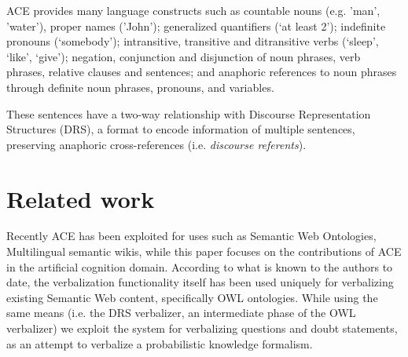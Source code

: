 \documentclass[oribibl]{llncs}
\begin{document}
ACE provides many language constructs such as countable nouns (e.g. 'man', 'water'), proper names ('John'); 
generalized quantifiers (‘at least 2’); indefinite pronouns (‘somebody’); intransitive, transitive and ditransitive verbs (‘sleep’, ‘like’, ‘give’); negation, conjunction and disjunction of noun phrases, verb phrases, relative clauses and sentences; and anaphoric references to noun phrases through definite noun phrases, pronouns, and variables.

These sentences have a two-way relationship with Discourse Representation Structures (DRS), a format to encode information of multiple sentences, preserving anaphoric cross-references (i.e. \textit{discourse referents})\cite{kamp1993discourse}.

\section{Related work}
Recently ACE has been exploited for uses such as Semantic Web Ontologies\cite{decoi2009rewerse}, Multilingual semantic wikis\cite{kuhnkaljurandsemantic}, while this paper focuses on the contributions of ACE in the artificial cognition domain.
According to what is known to the authors to date, the verbalization functionality itself\cite{kaljurand:phd} has been used uniquely for verbalizing existing Semantic Web content, specifically OWL ontologies.
While using the same means (i.e. the DRS verbalizer, an intermediate phase of the OWL verbalizer) we exploit the system for verbalizing questions and doubt statements, as an attempt to verbalize a probabilistic knowledge formalism.
\end{document}
